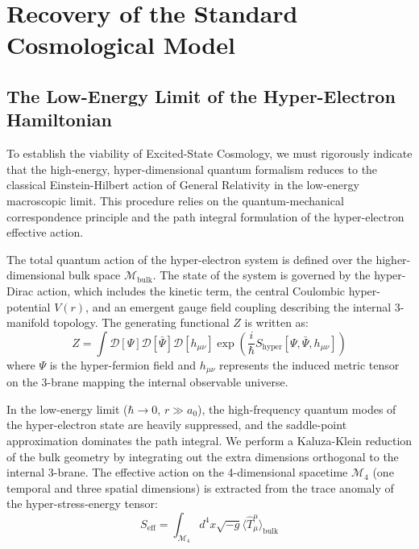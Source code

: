 \section{Recovery of the Standard Cosmological Model}

\subsection{The Low-Energy Limit of the Hyper-Electron Hamiltonian}

To establish the viability of Excited-State Cosmology, we must rigorously indicate that the high-energy, hyper-dimensional quantum formalism reduces to the classical Einstein-Hilbert action of General Relativity in the low-energy macroscopic limit. This procedure relies on the quantum-mechanical correspondence principle and the path integral formulation of the hyper-electron effective action.

The total quantum action of the hyper-electron system is defined over the higher-dimensional bulk space $\mathcal{M}_{\text{bulk}}$. The state of the system is governed by the hyper-Dirac action, which includes the kinetic term, the central Coulombic hyper-potential $V(r)$, and an emergent gauge field coupling describing the internal 3-manifold topology. The generating functional $Z$ is written as:
\begin{equation}
Z = \int \mathcal{D}[\Psi] \mathcal{D}[\bar{\Psi}] \mathcal{D}[h_{\mu\nu}] \exp\left( \frac{i}{\hbar} S_{\text{hyper}}[\Psi, \bar{\Psi}, h_{\mu\nu}] \right)
\end{equation}
where $\Psi$ is the hyper-fermion field and $h_{\mu\nu}$ represents the induced metric tensor on the 3-brane mapping the internal observable universe.

In the low-energy limit ($\hbar \to 0$, $r \gg a_0$), the high-frequency quantum modes of the hyper-electron state are heavily suppressed, and the saddle-point approximation dominates the path integral. We perform a Kaluza-Klein reduction of the bulk geometry by integrating out the extra dimensions orthogonal to the internal 3-brane. The effective action on the 4-dimensional spacetime $\mathcal{M}_4$ (one temporal and three spatial dimensions) is extracted from the trace anomaly of the hyper-stress-energy tensor:
\begin{equation}
S_{\text{eff}} = \int_{\mathcal{M}_4} d^4x \sqrt{-g} \langle \hat{T}^{\mu}_{\mu} \rangle_{\text{bulk}}
\end{equation}

